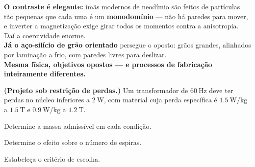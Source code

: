 \begin{questao}[4]{}
{\begin{center}
\begin{tabular}{lll}
\hline
\end{tabular}
\end{center}
\textbf{O contraste é elegante:} ímãs modernos de neodímio são feitos de
partículas tão pequenas que cada uma é um \textbf{monodomínio} --- não há
paredes para mover, e inverter a magnetização exige girar todos os momentos
contra a anisotropia. Daí a coercividade enorme.\\
\textbf{Já o aço-silício de grão orientado} persegue o oposto: grãos grandes,
alinhados por laminação a frio, com paredes livres para deslizar.\\
\textbf{Mesma física, objetivos opostos --- e processos de fabricação
inteiramente diferentes.}}
\end{questao}

\begin{questao}[4]{}
\textbf{(Projeto sob restrição de perdas.)} Um transformador de
$\SI{60}{\hertz}$ deve ter perdas no núcleo inferiores a $\SI{2}{\watt}$, com
material cuja perda específica é
$\SI{1.5}{\watt\per\kilogram}$ a $\SI{1.5}{\tesla}$ e
$\SI{0.9}{\watt\per\kilogram}$ a $\SI{1.2}{\tesla}$.
\begin{itensq}
\item Determine a massa admissível em cada condição.
\item Determine o efeito sobre o número de espiras.
\item Estabeleça o critério de escolha.
\end{itensq}
\end{questao}
